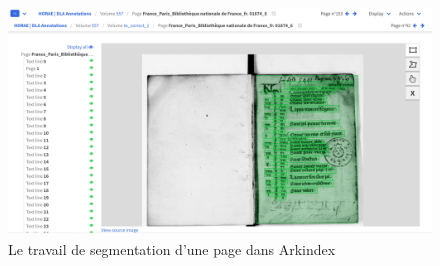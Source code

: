 \documentclass[a4paper,12pt,twoside]{book}
\begin{document}
    \begin{figure}[!h]
    \centering
    \includegraphics[width=13cm]{img/ML/Segmentation_Arkindex.png}
    \caption{Le travail de segmentation d'une page dans Arkindex}
    \end{figure}
	
	\backmatter



	\listoffigures

	\tableofcontents
	
\end{document}
